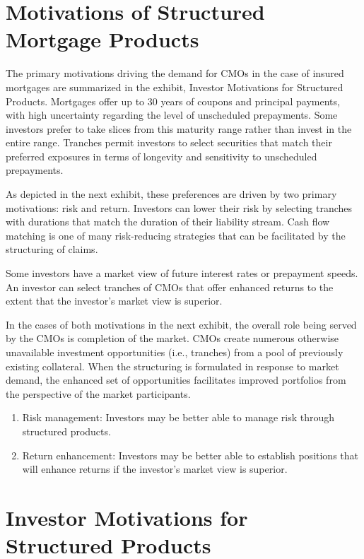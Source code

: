 \documentclass[11pt]{article}
\begin{document}
\section*{Motivations of Structured Mortgage Products}
The primary motivations driving the demand for CMOs in the case of insured mortgages are summarized in the exhibit, Investor Motivations for Structured Products. Mortgages offer up to 30 years of coupons and principal payments, with high uncertainty regarding the level of unscheduled prepayments. Some investors prefer to take slices from this maturity range rather than invest in the entire range. Tranches permit investors to select securities that match their preferred exposures in terms of longevity and sensitivity to unscheduled prepayments.

As depicted in the next exhibit, these preferences are driven by two primary motivations: risk and return. Investors can lower their risk by selecting tranches with durations that match the duration of their liability stream. Cash flow matching is one of many risk-reducing strategies that can be facilitated by the structuring of claims.

Some investors have a market view of future interest rates or prepayment speeds. An investor can select tranches of CMOs that offer enhanced returns to the extent that the investor's market view is superior.

In the cases of both motivations in the next exhibit, the overall role being served by the CMOs is completion of the market. CMOs create numerous otherwise unavailable investment opportunities (i.e., tranches) from a pool of previously existing collateral. When the structuring is formulated in response to market demand, the enhanced set of opportunities facilitates improved portfolios from the perspective of the market participants.

\begin{enumerate}
  \item Risk management: Investors may be better able to manage risk through structured products.

  \item Return enhancement: Investors may be better able to establish positions that will enhance returns if the investor's market view is superior.

\end{enumerate}

\section*{Investor Motivations for Structured Products}
\end{document}
